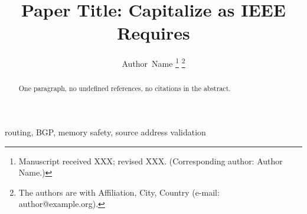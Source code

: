\documentclass[journal]{IEEEtran}
\begin{document}
\title{Paper Title: Capitalize as IEEE Requires}

\author{Author~Name%
\thanks{Manuscript received XXX; revised XXX. (Corresponding author:
Author Name.)}%
\thanks{The authors are with Affiliation, City, Country
(e-mail: author@example.org).}}

\maketitle

\begin{abstract}
One paragraph, no undefined references, no citations in the abstract.
\end{abstract}

\begin{IEEEkeywords}
routing, BGP, memory safety, source address validation
\end{IEEEkeywords}












\end{document}
